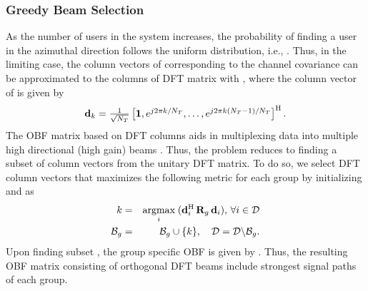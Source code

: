 \documentclass[letterpaper,conference,10pt]{IEEEtran}
\begin{document}
	\subsubsection{Greedy Beam Selection}	
	As the number of users in the system increases, the probability of finding a user in the azimuthal direction follows the uniform distribution, i.e., . Thus, in the limiting case, the column vectors of  corresponding to the channel covariance  can be approximated to the columns of \ac{DFT} matrix  with , where the  column vector of  is given by
	\begin{equation}
	\textstyle  \mathbf{d}_{k} = \frac{1}{\sqrt{N_T}} \left [ \mathbf{1}, e^{j2\pi k / N_T}, \ldots,  e^{j2\pi k (N_T-1) / N_T} \right ]^{\mathrm{H}}.
	\end{equation}
	The \ac{OBF} matrix based on \ac{DFT} columns aids in multiplexing data into multiple high directional (high gain) beams \cite{adhikary2013joint}. Thus, the problem reduces to finding a subset of column vectors from the unitary \ac{DFT} matrix. To do so, we select  \ac{DFT} column vectors that maximizes the following metric for each group  by initializing  and  as
	\begin{eqnarray}           
	\textstyle 	k &=& \underset{i}{\text{argmax}} \;(\mathbf{d}_{i}^{\mathrm{H}} \, \mathbf{R}_{g} \, \mathbf{d}_{i} ), \, \forall i \in \mathcal{D} \nonumber \\
	\textstyle \mathcal{B}_g &=& \mathcal{B}_g \cup \{k\},   \quad \mathcal{D} = \mathcal{D} \backslash \mathcal{B}_g.  
	\end{eqnarray}
	Upon finding subset , the group specific \ac{OBF} is given by . Thus, the resulting \ac{OBF} matrix  consisting of orthogonal \ac{DFT} beams include strongest signal paths of each group.
	\vspace{-1.2eM}
\end{document}
